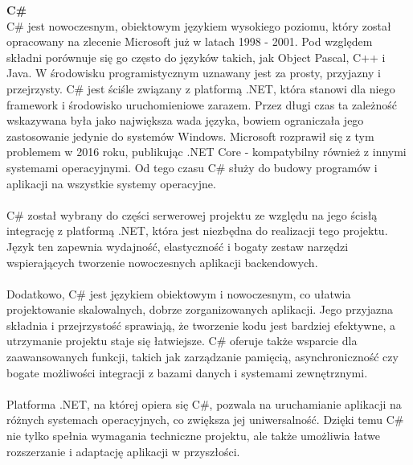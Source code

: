 \documentclass[twoside]{projektInzynierskiMS1}
\begin{document}
\noindent \textbf{C\#}\\
C\# jest nowoczesnym, obiektowym językiem wysokiego poziomu, który został opracowany na zlecenie Microsoft już w latach 1998 - 2001. Pod względem składni porównuje się go często do języków takich, jak Object Pascal, C++ i Java. W środowisku programistycznym uznawany jest za prosty, przyjazny i przejrzysty. C\# jest ściśle związany z platformą .NET, która stanowi dla niego framework i środowisko uruchomieniowe zarazem. Przez długi czas ta zależność wskazywana była jako największa wada języka, bowiem ograniczała jego zastosowanie jedynie do systemów Windows. Microsoft rozprawił się z tym problemem w 2016 roku, publikując .NET Core - kompatybilny również z innymi systemami operacyjnymi. Od tego czasu C\# służy do budowy programów i aplikacji na wszystkie systemy operacyjne.
\\\\
C\# został wybrany do części serwerowej projektu ze względu na jego ścisłą integrację z platformą .NET, która jest niezbędna do realizacji tego projektu. Język ten zapewnia wydajność, elastyczność i bogaty zestaw narzędzi wspierających tworzenie nowoczesnych aplikacji backendowych.
\\\\
Dodatkowo, C\# jest językiem obiektowym i nowoczesnym, co ułatwia projektowanie skalowalnych, dobrze zorganizowanych aplikacji. Jego przyjazna składnia i przejrzystość sprawiają, że tworzenie kodu jest bardziej efektywne, a utrzymanie projektu staje się łatwiejsze. C\# oferuje także wsparcie dla zaawansowanych funkcji, takich jak zarządzanie pamięcią, asynchroniczność czy bogate możliwości integracji z bazami danych i systemami zewnętrznymi.
\\\\
Platforma .NET, na której opiera się C\#, pozwala na uruchamianie aplikacji na różnych systemach operacyjnych, co zwiększa jej uniwersalność. Dzięki temu C\# nie tylko spełnia wymagania techniczne projektu, ale także umożliwia łatwe rozszerzanie i adaptację aplikacji w przyszłości.
\\\\
\end{document}
